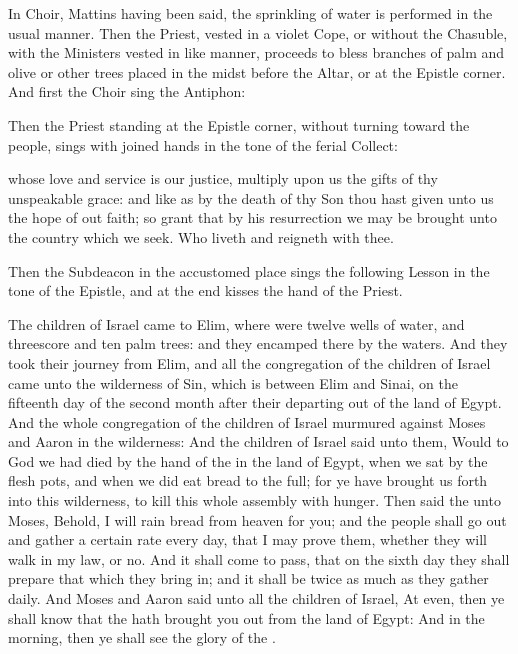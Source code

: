 \begin{rubric}
In Choir, Mattins having been said, the sprinkling of water is performed in the usual manner. Then the Priest, vested in a violet Cope, or without the Chasuble, with the Ministers vested in like manner, proceeds to bless branches of palm and olive or other trees placed in the midst before the Altar, or at the Epistle corner. And first the Choir sing the Antiphon:
\end{rubric}
\begin{rubric}
    Then the Priest standing at the Epistle corner, without turning toward the people, sings with joined hands in the tone of the ferial Collect:
\end{rubric}
{} whose love and service is our justice, multiply upon us the gifts of thy unspeakable grace: and like as by the death of thy Son thou hast given unto us the hope of out faith; so grant that by his resurrection we may be brought unto the country which we seek. Who liveth and reigneth with thee.
\begin{rubric}
    Then the Subdeacon in the accustomed place sings the following Lesson in the tone of the Epistle, and at the end kisses the hand of the Priest.
\end{rubric}
 The children of Israel came to Elim, where were twelve wells of water, and threescore and ten palm trees: and they encamped there by the waters. And they took their journey from Elim, and all the congregation of the children of Israel came unto the wilderness of Sin, which is between Elim and Sinai, on the fifteenth day of the second month after their departing out of the land of Egypt. And the whole congregation of the children of Israel murmured against Moses and Aaron in the wilderness: And the children of Israel said unto them, Would to God we had died by the hand of the  in the land of Egypt, when we sat by the flesh pots, and when we did eat bread to the full; for ye have brought us forth into this wilderness, to kill this whole assembly with hunger. Then said the  unto Moses, Behold, I will rain bread from heaven for you; and the people shall go out and gather a certain rate every day, that I may prove them, whether they will walk in my law, or no. And it shall come to pass, that on the sixth day they shall prepare that which they bring in; and it shall be twice as much as they gather daily. And Moses and Aaron said unto all the children of Israel, At even, then ye shall know that the  hath brought you out from the land of Egypt: And in the morning, then ye shall see the glory of the .
